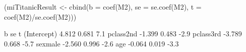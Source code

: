 \begin{Schunk}
\begin{Sinput}
 (miTitanicResult <- cbind(b = coef(M2), se = se.coef(M2), t = coef(M2)/se.coef(M2)))
\end{Sinput}
\begin{Soutput}
                 b    se    t
(Intercept)  4.812 0.681  7.1
pclass2nd   -1.399 0.483 -2.9
pclass3rd   -3.789 0.668 -5.7
sexmale     -2.560 0.996 -2.6
age         -0.064 0.019 -3.3
\end{Soutput}
\end{Schunk}
